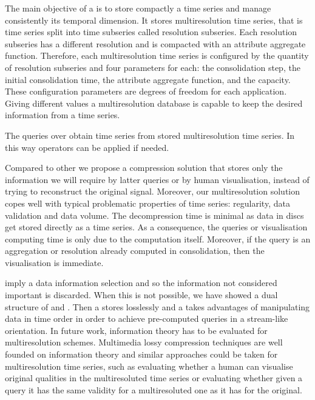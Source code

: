 The main objective of a  is to store compactly a time
series and manage consistently its temporal dimension.  It stores
multiresolution time series, that is time series split into time
subseries called resolution subseries.  Each resolution subseries has
a different resolution and is compacted with an attribute aggregate
function. Therefore, each multiresolution time series is configured by
the quantity of resolution subseries and four parameters for each: the
consolidation step, the initial consolidation time, the attribute
aggregate function, and the capacity.  These configuration parameters
are degrees of freedom for each application. Giving different
values a multiresolution database is capable to keep the desired
information from a time series.



The queries over  obtain time series from stored
multiresolution time series. In this way  operators can be
applied if needed.


Compared to other  we propose a compression solution that
stores only the information we will require by latter queries or by
human visualisation, instead of trying to reconstruct the original
signal.  Moreover, our multiresolution solution copes well with
typical problematic properties of time series: regularity, data
validation and data volume.  The decompression time is minimal as data
in discs get stored directly as a time series. As a consequence, the
queries or visualisation computing time is only due to the computation
itself. Moreover, if the query is an aggregation or resolution already
computed in  consolidation, then the visualisation is
immediate.


 imply a data information selection and so the information
not considered important is discarded. When this is not possible, we
have showed a dual structure of  and . Then a
 stores losslessly and a  takes advantages of
manipulating data in time order in order to achieve pre-computed
queries in a stream-like orientation.  In future work, information
theory has to be evaluated for multiresolution schemes. Multimedia
lossy compression techniques are well founded on information theory
and similar approaches could be taken for multiresolution time series,
such as evaluating whether a human can visualise original qualities in
the multiresoluted time series or evaluating
whether given a query it has the same validity for a multiresoluted
one as it has for the original.




